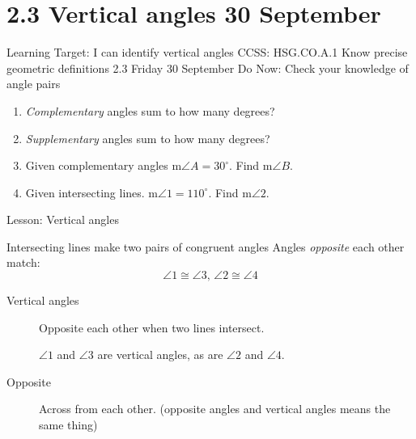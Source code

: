 \section{2.3 Vertical angles \hfill 30 September}
\begin{frame}{Learning Target: I can identify vertical angles}
  {CCSS: HSG.CO.A.1 Know precise geometric definitions  \hfill \alert{2.3 Friday 30 September}}
    Do Now: Check your knowledge of angle pairs
      \begin{enumerate}
        \item \emph{Complementary} angles sum to how many degrees?
        \item \emph{Supplementary} angles sum to how many degrees?
        \item Given complementary angles m$\angle A= 30^\circ$. Find m$\angle B$.
        \item Given intersecting lines. m$\angle 1 = 110^\circ$. Find m$\angle 2$. \medskip
          \begin{flushright}
          \end{flushright}
      \end{enumerate}
    Lesson: Vertical angles
  \end{frame}

\begin{frame}{Intersecting lines make two pairs of congruent angles}
  Angles \emph{opposite} each other match: 
    $$\angle 1 \cong \angle 3 \text{, } \angle 2 \cong \angle 4$$
  \begin{center}
  \end{center}
\begin{description}
  \item[Vertical angles] Opposite each other when two lines intersect. \par 
    $\angle 1$ and $\angle 3$ are vertical angles, as are $\angle 2$ and $\angle 4$.
  \item[Opposite] Across from each other. (opposite angles and vertical angles means the same thing)
\end{description}
\end{frame}

